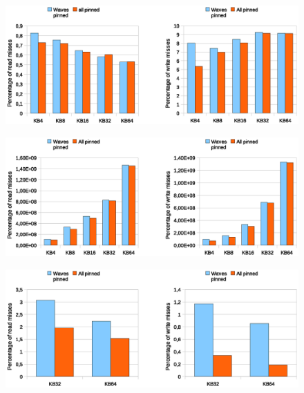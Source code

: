 \begin{figure}[htbp]
\centering
\includegraphics[width=\widefigure]{images/cpuaff/cpuaff_l1_load_store_Xeon.eps}
\caption{}
\label{fig:cpuaff_l1_load_store_xeon}
\end{figure}
\newpage
\begin{figure}[htbp]
\centering
\includegraphics[width=\widefigure]{images/cpuaff/cpuaff_acc_l2_load_store_Xeon.eps}
\caption{}
\label{fig:cpuaff_acc_l2_load_store_xeon}
\end{figure}

\begin{figure}[htbp]
\centering
\includegraphics[width=\widefigure]{images/cpuaff/cpuaff_l2_load_store_Xeon.eps}
\caption{}
\label{fig:cpuaff_l2_load_store_xeon}
\end{figure}


